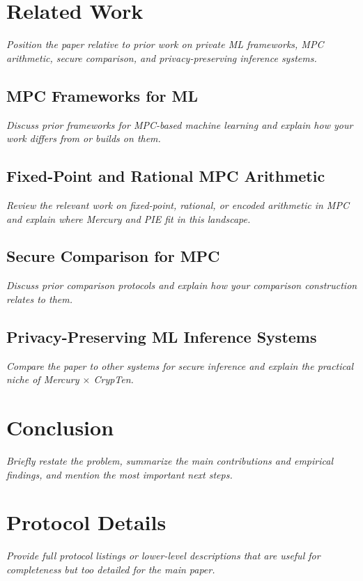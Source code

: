 \section{Related Work}
\textit{Position the paper relative to prior work on private ML frameworks, MPC arithmetic, secure comparison, and privacy-preserving inference systems.}

\subsection{MPC Frameworks for ML}
\textit{Discuss prior frameworks for MPC-based machine learning and explain how your work differs from or builds on them.}

\subsection{Fixed-Point and Rational MPC Arithmetic}
\textit{Review the relevant work on fixed-point, rational, or encoded arithmetic in MPC and explain where Mercury and PIE fit in this landscape.}

\subsection{Secure Comparison for MPC}
\textit{Discuss prior comparison protocols and explain how your comparison construction relates to them.}

\subsection{Privacy-Preserving ML Inference Systems}
\textit{Compare the paper to other systems for secure inference and explain the practical niche of Mercury $\times$ CrypTen.}

\section{Conclusion}
\textit{Briefly restate the problem, summarize the main contributions and empirical findings, and mention the most important next steps.}

\appendix

\section{Protocol Details}
\textit{Provide full protocol listings or lower-level descriptions that are useful for completeness but too detailed for the main paper.}

